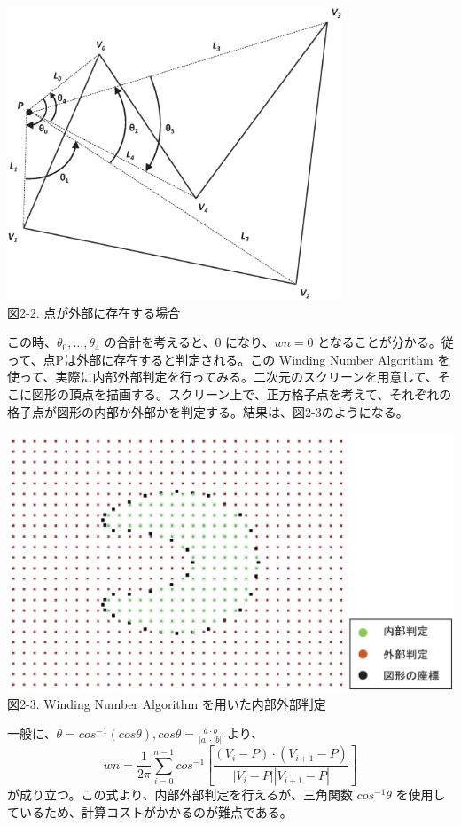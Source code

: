 \begin{center}
  \includegraphics[width=10cm]{wn_outside.eps} \\
 \vspace{1mm}
  図2-2. 点が外部に存在する場合
\end{center}

この時、$\theta_0, \ldots, \theta_4$ の合計を考えると、$0$ になり、$wn = 0$ となることが分かる。従って、点Pは外部に存在すると判定される。この Winding Number Algorithm を使って、実際に内部外部判定を行ってみる。二次元のスクリーンを用意して、そこに図形の頂点を描画する。スクリーン上で、正方格子点を考えて、それぞれの格子点が図形の内部か外部かを判定する。結果は、図2-3のようになる。

 \vspace{-5mm}
\begin{center}
  \includegraphics[width=14cm]{iedecision_2d.eps} \\
 \vspace{-10mm}
  図2-3. Winding Number Algorithm を用いた内部外部判定
\end{center}

\newpage
一般に、$\theta = cos^{-1}(cos \theta), cos \theta = \frac{a \cdot b}{|a| \cdot |b|}$ より、
\[
wn = \frac{1}{2\pi}\sum_{i=0}^{n-1}cos^{-1}\left[\frac{(V_i - P) \cdot (V_{i+1} - P)}{|V_i - P||V_{i+1} - P|}\right]
\]
が成り立つ。この式より、内部外部判定を行えるが、三角関数 $cos^{-1} \theta$ を使用しているため、計算コストがかかるのが難点である。















